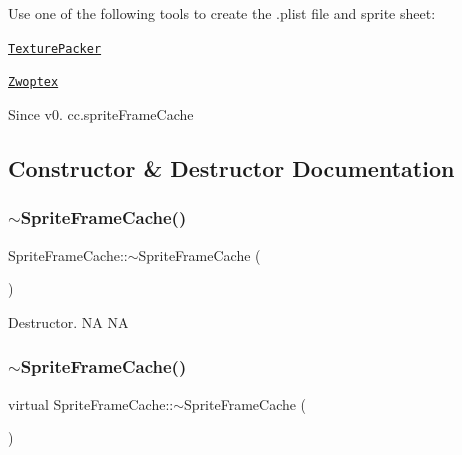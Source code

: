 Use one of the following tools to create the .plist file and sprite sheet\+:
\begin{DoxyItemize}
\item \href{https://www.codeandweb.com/texturepacker/cocos2d}{\tt Texture\+Packer}
\item \href{https://zwopple.com/zwoptex/}{\tt Zwoptex}
\end{DoxyItemize}

\begin{DoxySince}{Since}
v0.  cc.\+sprite\+Frame\+Cache 
\end{DoxySince}


\subsection{Constructor \& Destructor Documentation}
\mbox{\label{classSpriteFrameCache_aa8c9088cb2b31d8ec6ff3e958f392ff7}} 
\subsubsection{\texorpdfstring{$\sim$\+Sprite\+Frame\+Cache()}{~SpriteFrameCache()}\hspace{0.1cm}{\footnotesize\ttfamily [1/2]}}
{\footnotesize\ttfamily Sprite\+Frame\+Cache\+::$\sim$\+Sprite\+Frame\+Cache (\begin{DoxyParamCaption}{ }\end{DoxyParamCaption})\hspace{0.3cm}{\ttfamily [virtual]}}

Destructor.  NA  NA \mbox{\label{classSpriteFrameCache_aa1cbd30365b501ea6f44189b8eeaa686}} 
\subsubsection{\texorpdfstring{$\sim$\+Sprite\+Frame\+Cache()}{~SpriteFrameCache()}\hspace{0.1cm}{\footnotesize\ttfamily [2/2]}}
{\footnotesize\ttfamily virtual Sprite\+Frame\+Cache\+::$\sim$\+Sprite\+Frame\+Cache (\begin{DoxyParamCaption}{ }\end{DoxyParamCaption})\hspace{0.3cm}{\ttfamily [virtual]}}

